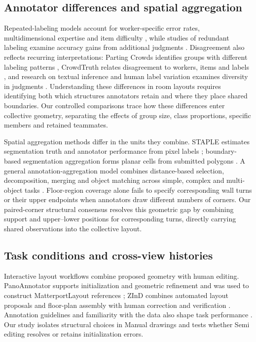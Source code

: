 \subsection{Annotator differences and spatial aggregation}
Repeated-labeling models account for worker-specific error rates, multidimensional expertise and item difficulty \cite{c2ref13,c2ref08,c2ref09}, while studies of redundant labeling examine accuracy gains from additional judgments \cite{c2ref19,c2ref25}. Disagreement also reflects recurring interpretations: Parting Crowds identifies groups with different labeling patterns \cite{c2ref07}, CrowdTruth relates disagreement to workers, items and labels \cite{c2ref11}, and research on textual inference and human label variation examines diversity in judgments \cite{c2ref10,plank2022variation}. Understanding these differences in room layouts requires identifying both which structures annotators retain and where they place shared boundaries. Our controlled comparisons trace how these differences enter collective geometry, separating the effects of group size, class proportions, specific members and retained teammates.

Spatial aggregation methods differ in the units they combine. STAPLE estimates segmentation truth and annotator performance from pixel labels \cite{c2ref14}; boundary-based segmentation aggregation forms planar cells from submitted polygons \cite{lee2018}. A general annotation-aggregation model combines distance-based selection, decomposition, merging and object matching across simple, complex and multi-object tasks \cite{c2ref17}. Floor-region coverage alone fails to specify corresponding wall turns or their upper endpoints when annotators draw different numbers of corners. Our paired-corner structural consensus resolves this geometric gap by combining support and upper--lower positions for corresponding turns, directly carrying shared observations into the collective layout.

\subsection{Task conditions and cross-view histories}
Interactive layout workflows combine proposed geometry with human editing. PanoAnnotator supports initialization and geometric refinement and was used to construct MatterportLayout references \cite{pano2018,zou2021manhattan}; ZInD combines automated layout proposals and floor-plan assembly with human correction and verification \cite{cruz2021zind}. Annotation guidelines and familiarity with the data also shape task performance \cite{c2ref21,c2ref12}. Our study isolates structural choices in Manual drawings and tests whether Semi editing resolves or retains initialization errors.

